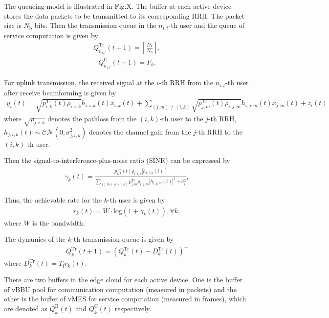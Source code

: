 \documentclass[journal, 12pt, onecolumn, draftclsnofoot]{IEEEtran}
\begin{document}
The queueing model is illustrated in Fig.X. The buffer at each active device stores the data packets to be transmitted to its corresponding RRH. The packet size is ${N_\mathrm{b}}$ bits. Then the transmission queue in the $n_{i,t}$-th user and the queue of service computation is given by
\begin{align}
	Q_{n_{i,t}}^{\mathrm{Tr}}(t+1)=\left\lfloor\frac{D_{k}}{N_\mathrm{b}}\right\rfloor,
\end{align}
\begin{align}
	Q_{n_{i,t}}^{\mathrm{C}}(t+1)=F_{k}.
\end{align}

For uplink transmission, the received signal at the $i$-th RRH from the $n_{i,t}$-th user after receive beamforming is given by
\begin{align}
	y_{i}(t) = \sqrt{p_{i,k}^{\mathrm{Tr}}(t)\rho_{i,i,k}}h_{i,i,k}(t)x_{i,k}(t)+\sum_{(j,m)\neq (i,k)}\sqrt{p_{j,m}^{\mathrm{Tr}}(t)\rho_{i,j,m}}h_{i,j,m}(t)x_{j,m}(t)+z_{i}(t)
\end{align}
where $\sqrt{\rho_{j,i,k}}$ denotes the pathloss from the $(i,k)$-th user to the $j$-th RRH, $h_{j,i,k}(t)\sim \mathcal{CN}(0,\sigma_{j,i,k}^{2})$ denotes the channel gain from the $j$-th RRH to the $(i,k)$-th user.

Then the signal-to-interference-plus-noise ratio (SINR) can be expressed by
\begin{align}
	\gamma_{k}(t)=\frac{p_{i,k}^{\mathrm{Tr}}(t)\rho_{i,i,k}|h_{i,i,k}(t)|^2}{\sum_{(j,m)\neq (i,k)}p_{j,m}^{\mathrm{Tr}}\rho_{i,j,m}|h_{i,j,m}(t)|^{2}+\sigma_{i}^{2}},
\end{align}

Thus, the achievable rate for the $k$-th user is given by
\begin{align}
	r_{k}(t)= W\cdot \text{log}(1+\gamma_{k}(t)), \forall k,
\end{align}
where $W$ is the bandwidth.

The dynamics of the $k$-th transmission queue is given by
\begin{align}
	Q_{k}^{\mathrm{Tr}}(t+1)=(Q_{k}^{\mathrm{Tr}}(t)-D_{k}^{\mathrm{Tr}}(t))^{+}
\end{align}
where $D_{k}^{\mathrm{Tr}}(t)=T_{\mathrm{f}}r_{k}(t)$.

There are two buffers in the edge cloud for each active device. One is the buffer of vBBU pool for communication computation (measured in packets) and the other is the buffer of vMES for service computation (measured in frames), which are denoted as $Q_{k}^{\mathrm{B}}(t)$ and $Q_{k}^{\mathrm{C}}(t)$ respectively.
\end{document}
